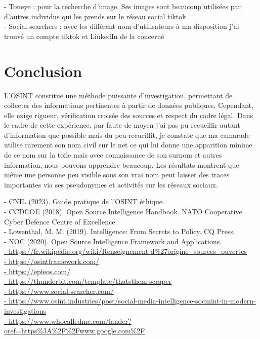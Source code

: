 \documentclass[french]{article}
\begin{document}
\vfill
-	Toneye : pour la recherche d’image. Ses images sont beaucoup utilisées par d’autres individus qui les prends sur le réseau social tiktok.\\
-	Social searchers : avec les diffèrent nom d’utilisateurs à ma disposition j’ai trouvé un compte tiktok et LinkedIn de la concerné

\section{Conclusion}
L’OSINT constitue une méthode puissante d’investigation, permettant de collecter des informations pertinentes à partir de données publiques. Cependant, elle exige rigueur, vérification croisée des sources et respect du cadre légal. Dans le cadre de cette expérience, par faute de moyen j’ai pas pu recueillir autant d’information que possible mais du peu recueillit, je constate que ma camarade utilise rarement son nom civil sur le net ce qui lui donne une apparition minime de ce nom sur la toile mais avec connaissance de son surnom et autres information, nous pouvons apprendre beaucoup. Les résultats montrent que même une personne peu visible sous son vrai nom peut laisser des traces importantes via ses pseudonymes et activités sur les réseaux sociaux.
\newpage
\begin{thebibliography}{}
	- CNIL (2023). Guide pratique de l’OSINT éthique.\\
	- CCDCOE (2018). Open Source Intelligence Handbook. NATO Cooperative Cyber Defence Centre of Excellence.\\
	- Lowenthal, M. M. (2019). Intelligence: From Secrets to Policy. CQ Press.\\
	- NOC (2020). Open Source Intelligence Framework and Applications.\\
    \url{- https://fr.wikipedia.org/wiki/Renseignement d\%27origine\_sources\_ouvertes}\\
	\url{- https://osintframework.com/}\\
	\url{- https://epieos.com/}\\
	\url{- https://thunderbit.com/template/thatsthem-scraper}\\
	\url{- https://www.social-searcher.com/}\\
	\url{- https://www.osint.industries/post/social-media-intelligence-socmint-in-modern-investigations}\\
	\url{- https://www.whocalledme.com/lander?oref=https\%3A\%2F\%2Fwww.google.com\%2F}\\
\end{thebibliography}
\end{document}
